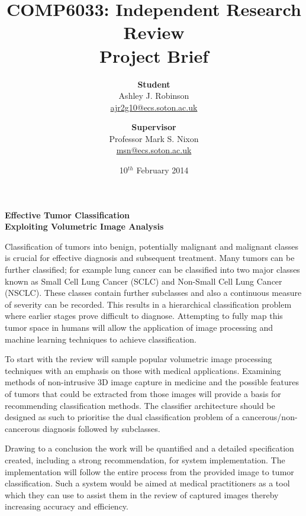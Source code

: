 \documentclass[a4paper,11pt]{article}
\begin{document}

\title{\textbf{COMP6033: Independent Research Review\\Project Brief\\}}

\author{\textbf{Student}\\
	Ashley J. Robinson\\
	\href{mailto:ajr2g10@ecs.soton.ac.uk}{ajr2g10@ecs.soton.ac.uk}\\
\and
	\textbf{Supervisor}\\
	Professor Mark S. Nixon\\
	\href{mailto:msn@ecs.soton.ac.uk}{msn@ecs.soton.ac.uk}\\
}
\UKvardate


\date{10$^{th}$ February 2014\\[0cm]}
\maketitle

\begin{center}
{\large \textbf{Effective Tumor Classification\\ Exploiting Volumetric Image Analysis}}\\[6mm]
\end{center}

Classification of tumors into benign, potentially malignant and malignant classes is crucial for effective diagnosis and subsequent treatment. 
Many tumors can be further classified; for example lung cancer can be classified into two major classes known as Small Cell Lung Cancer (SCLC) and Non-Small Cell Lung Cancer (NSCLC).
These classes contain further subclasses and also a continuous measure of severity can be recorded. 
This results in a hierarchical classification problem where earlier stages prove difficult to diagnose.
Attempting to fully map this tumor space in humans will allow the application of image processing and machine learning techniques to achieve classification.  
  
To start with the review will sample popular volumetric image processing techniques with an emphasis on those with medical applications. 
Examining methods of non-intrusive 3D image capture in medicine and the possible features of tumors that could be extracted from those images will provide a basis for recommending classification methods.
The classifier architecture should be designed as such to prioritise the dual classification problem of a cancerous/non-cancerous diagnosis followed by subclasses.   

Drawing to a conclusion the work will be quantified and a detailed specification created, including a strong recommendation, for system implementation.
The implementation will follow the entire process from the provided image to tumor classification. 
Such a system would be aimed at medical practitioners as a tool which they can use to assist them in the review of captured images thereby increasing accuracy and efficiency.

\end{document}
